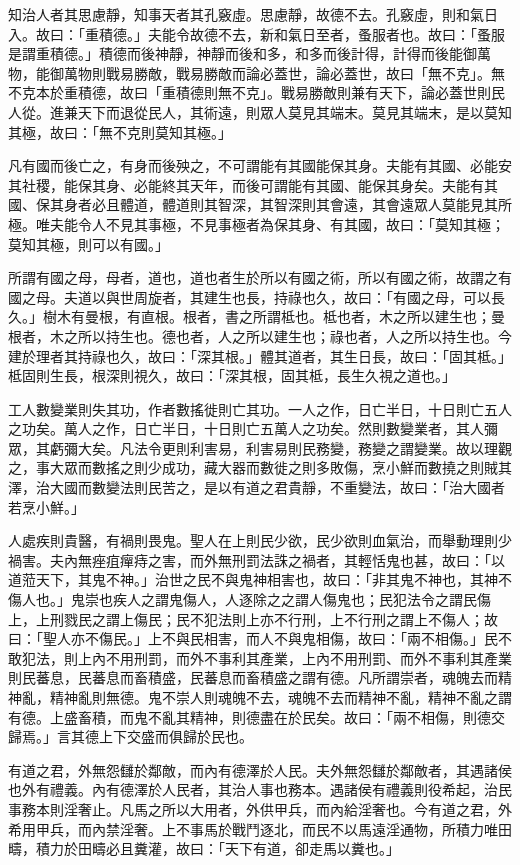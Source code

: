 \begin{pinyinscope}
知治人者其思慮靜，知事天者其孔竅虛。思慮靜，故德不去。孔竅虛，則和氣日入。故曰：「重積德。」夫能令故德不去，新和氣日至者，蚤服者也。故曰：「蚤服是謂重積德。」積德而後神靜，神靜而後和多，和多而後計得，計得而後能御萬物，能御萬物則戰易勝敵，戰易勝敵而論必蓋世，論必蓋世，故曰「無不克」。無不克本於重積德，故曰「重積德則無不克」。戰易勝敵則兼有天下，論必蓋世則民人從。進兼天下而退從民人，其術遠，則眾人莫見其端末。莫見其端末，是以莫知其極，故曰：「無不克則莫知其極。」

凡有國而後亡之，有身而後殃之，不可謂能有其國能保其身。夫能有其國、必能安其社稷，能保其身、必能終其天年，而後可謂能有其國、能保其身矣。夫能有其國、保其身者必且體道，體道則其智深，其智深則其會遠，其會遠眾人莫能見其所極。唯夫能令人不見其事極，不見事極者為保其身、有其國，故曰：「莫知其極；莫知其極，則可以有國。」

所謂有國之母，母者，道也，道也者生於所以有國之術，所以有國之術，故謂之有國之母。夫道以與世周旋者，其建生也長，持祿也久，故曰：「有國之母，可以長久。」樹木有曼根，有直根。根者，書之所謂柢也。柢也者，木之所以建生也；曼根者，木之所以持生也。德也者，人之所以建生也；祿也者，人之所以持生也。今建於理者其持祿也久，故曰：「深其根。」體其道者，其生日長，故曰：「固其柢。」柢固則生長，根深則視久，故曰：「深其根，固其柢，長生久視之道也。」

工人數變業則失其功，作者數搖徙則亡其功。一人之作，日亡半日，十日則亡五人之功矣。萬人之作，日亡半日，十日則亡五萬人之功矣。然則數變業者，其人彌眾，其虧彌大矣。凡法令更則利害易，利害易則民務變，務變之謂變業。故以理觀之，事大眾而數搖之則少成功，藏大器而數徙之則多敗傷，烹小鮮而數撓之則賊其澤，治大國而數變法則民苦之，是以有道之君貴靜，不重變法，故曰：「治大國者若烹小鮮。」

人處疾則貴醫，有禍則畏鬼。聖人在上則民少欲，民少欲則血氣治，而舉動理則少禍害。夫內無痤疽癉痔之害，而外無刑罰法誅之禍者，其輕恬鬼也甚，故曰：「以道蒞天下，其鬼不神。」治世之民不與鬼神相害也，故曰：「非其鬼不神也，其神不傷人也。」鬼崇也疾人之謂鬼傷人，人逐除之之謂人傷鬼也；民犯法令之謂民傷上，上刑戮民之謂上傷民；民不犯法則上亦不行刑，上不行刑之謂上不傷人；故曰：「聖人亦不傷民。」上不與民相害，而人不與鬼相傷，故曰：「兩不相傷。」民不敢犯法，則上內不用刑罰，而外不事利其產業，上內不用刑罰、而外不事利其產業則民蕃息，民蕃息而畜積盛，民蕃息而畜積盛之謂有德。凡所謂崇者，魂魄去而精神亂，精神亂則無德。鬼不崇人則魂魄不去，魂魄不去而精神不亂，精神不亂之謂有德。上盛畜積，而鬼不亂其精神，則德盡在於民矣。故曰：「兩不相傷，則德交歸焉。」言其德上下交盛而俱歸於民也。

有道之君，外無怨讎於鄰敵，而內有德澤於人民。夫外無怨讎於鄰敵者，其遇諸侯也外有禮義。內有德澤於人民者，其治人事也務本。遇諸侯有禮義則役希起，治民事務本則淫奢止。凡馬之所以大用者，外供甲兵，而內給淫奢也。今有道之君，外希用甲兵，而內禁淫奢。上不事馬於戰鬥逐北，而民不以馬遠淫通物，所積力唯田疇，積力於田疇必且糞灌，故曰：「天下有道，卻走馬以糞也。」


\end{pinyinscope}
